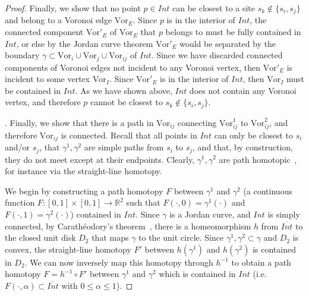 \documentclass[11pt]{article}
\newcommand{\Vor}{\text{Vor}}
\begin{document}
\begin{proof}
Finally, we show that no point $p\in Int$ can be closest to a site $s_k\notin\{s_i,s_j\}$ 
	and belong to a Voronoi edge $\Vor_E$. 
Since $p$ is in the interior of $Int$, the connected component $\Vor'_E$ of $\Vor_E$ that $p$ belongs to 
	must be fully contained in $Int$, 
	or else by the Jordan curve theorem $\Vor'_E$ would be separated by the boundary $\gamma\subset \Vor_i\cup\Vor_j\cup\Vor_{ij}$ of $Int$. 
Since we have discarded connected components of Voronoi edges not incident to any Voronoi vertex, 
	then $\Vor'_E$ is incident to some vertex $\Vor_I$. 
Since $\Vor'_E$ is in the interior of $Int$, then $\Vor_I$ must be contained in $Int$. 
As we have shown above, $Int$ does not contain any Voronoi vertex, and therefore $p$ cannot be closest to $s_k\notin\{s_i,s_j\}$. 





\vspace*{0.1in}\noindent{\bf [$\Vor_{ij}$ is connected]}.
Finally, we show that there is a path in $\Vor_{ij}$ connecting $\Vor^1_{ij}$ to $\Vor^2_{ij}$, 
	and therefore $\Vor_{ij}$ is connected. 
Recall that all points in $Int$ can only be closest to $s_i$ and/or $s_j$, 
	that $\gamma^1,\gamma^2$ are simple paths from $s_i$ to $s_j$, 
	and that, by construction, they do not meet except at their endpoints. 
Clearly, $\gamma^1,\gamma^2$ are path homotopic~\cite[p.\ 323]{munkres2000topology}, 
	for instance via the straight-line homotopy. 



We begin by constructing a path homotopy $F$ between $\gamma^1$ and $\gamma^2$
	(a continuous function $F:[0,1]\times [0,1]\rightarrow \mathbb{R}^2$ 
		such that $F(\cdot,0)=\gamma^1(\cdot)$ and $F(\cdot,1)=\gamma^2(\cdot)$)
	contained in $Int$. 
Since $\gamma$ is a Jordan curve, and $Int$ is simply connected, by Carath\'eodory's theorem~\cite{conformal}, 
	there is a homeomorphism $h$ from $\overline{Int}$ to the closed unit disk $D_2$ that maps $\gamma$ to the unit circle. 
Since $\gamma^1,\gamma^2\subset\gamma$ and $D_2$ is convex, the straight-line homotopy $F'$ 
	between $h(\gamma^1)$  and $h(\gamma^2)$ is contained in $D_2$. 
We can now inversely map this homotopy through $h^{-1}$ to obtain a path homotopy $F=h^{-1}\circ F'$ 
	between $\gamma^1$ and $\gamma^2$ which is contained in $Int$ 
	(i.e.\ $F(\cdot,\alpha)\subset\overline{Int}$ with $0\le\alpha\le 1$). 




\end{proof}
\end{document}
